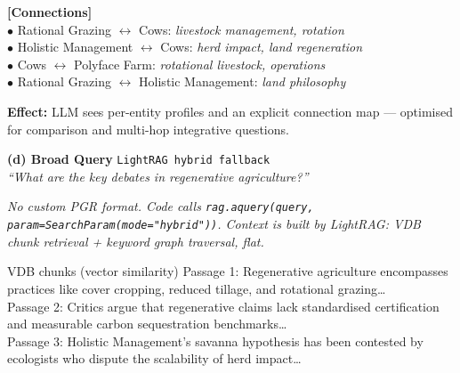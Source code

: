 \documentclass{article}
\newcommand{\fn}[1]{\texttt{\footnotesize\color{gray!70}#1}}
\newcommand{\paneltitle}[3]{%
  \begin{tcolorbox}[
    colback=querybg, colframe=querybg,
    boxrule=0pt, arc=4pt, top=4pt, bottom=4pt, left=6pt, right=6pt]
    {\small\bfseries\sffamily\color{white} #1}
    \hfill{\tiny\sffamily\color{white!70}\texttt{#2}}\\[1pt]
    {\scriptsize\sffamily\color{white!85}\textit{``#3''}}
  \end{tcolorbox}%
}
\begin{document}
\begin{minipage}[t]{0.487\textwidth}
\vspace{3pt}

\begin{tcolorbox}[colback=multibg!60, colframe=multiborder, boxrule=0.7pt,
  arc=3pt, top=2pt, bottom=2pt, left=5pt, right=4pt]
\scriptsize\sffamily\textbf{\color{violet!70!black}[Connections]}\\
\quad $\bullet$ Rational Grazing $\leftrightarrow$ Cows: \textit{livestock management, rotation}\\
\quad $\bullet$ Holistic Management $\leftrightarrow$ Cows: \textit{herd impact, land regeneration}\\
\quad $\bullet$ Cows $\leftrightarrow$ Polyface Farm: \textit{rotational livestock, operations}\\
\quad $\bullet$ Rational Grazing $\leftrightarrow$ Holistic Management: \textit{land philosophy}
\end{tcolorbox}

\vspace{4pt}
{\scriptsize\sffamily\color{violet!70!black!90}
\textbf{Effect:} LLM sees per-entity profiles and an explicit connection map — optimised
for comparison and multi-hop integrative questions.}

\vspace{10pt}

\paneltitle{(d) Broad Query}{LightRAG hybrid fallback}{What are the key debates in regenerative agriculture?}

\vspace{4pt}

{\scriptsize\sffamily\color{gray!60}
\textit{No custom PGR format. Code calls \fn{rag.aquery(query, param=SearchParam(mode="hybrid"))}.
Context is built by LightRAG: VDB chunk retrieval + keyword graph traversal, flat.}}

\vspace{4pt}

\begin{broadbox}{VDB chunks (vector similarity)}
\scriptsize\sffamily\color{gray!80}
Passage 1: Regenerative agriculture encompasses practices like cover cropping,
reduced tillage, and rotational grazing\ldots\\[2pt]
Passage 2: Critics argue that regenerative claims lack standardised
certification and measurable carbon sequestration benchmarks\ldots\\[2pt]
Passage 3: Holistic Management's savanna hypothesis has been contested by
ecologists who dispute the scalability of herd impact\ldots
\end{broadbox}


\end{minipage}
\end{document}
